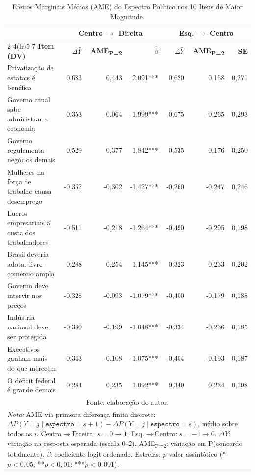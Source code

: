 \begin{table}[htbp]
\centering
\SingleSpacing
\caption{Efeitos Marginais Médios (AME) do Espectro Político nos 10 Itens de Maior Magnitude.}
\label{tab:ame_espectro_top10}
\footnotesize
\begin{tabular}{p{5.2cm}rrrrrr}
\toprule
 & \multicolumn{3}{c}{\textbf{Centro $\to$ Direita}} & \multicolumn{3}{c}{\textbf{Esq. $\to$ Centro}} \\
\cmidrule(lr){2-4}\cmidrule(lr){5-7}
\textbf{Item (DV)} & \textbf{$\Delta\bar{Y}$} & \textbf{AME\textsubscript{P=2}} & \textbf{$\hat{\beta}$} & \textbf{$\Delta\bar{Y}$} & \textbf{AME\textsubscript{P=2}} & \textbf{SE} \\
\midrule
Privatização de estatais é benéfica & 0,683 & 0,443 & 2,091*** & 0,620 & 0,158 & 0,271 \\
Governo atual sabe administrar a economia & -0,353 & -0,064 & -1,999*** & -0,675 & -0,265 & 0,293 \\
Governo regulamenta negócios demais & 0,529 & 0,377 & 1,842*** & 0,535 & 0,176 & 0,250 \\
Mulheres na força de trabalho causa desemprego & -0,352 & -0,302 & -1,427*** & -0,260 & -0,247 & 0,246 \\
Lucros empresariais à custa dos trabalhadores & -0,511 & -0,218 & -1,264*** & -0,490 & -0,295 & 0,198 \\
Brasil deveria adotar livre-comércio amplo & 0,288 & 0,254 & 1,145*** & 0,323 & 0,233 & 0,202 \\
Governo deve intervir nos preços & -0,328 & -0,093 & -1,079*** & -0,400 & -0,179 & 0,188 \\
Indústria nacional deve ser protegida & -0,380 & -0,199 & -1,048*** & -0,334 & -0,236 & 0,185 \\
Executivos ganham mais do que merecem & -0,343 & -0,108 & -1,075*** & -0,404 & -0,193 & 0,187 \\
O déficit federal é grande demais & 0,284 & 0,235 & 1,092*** & 0,349 & 0,234 & 0,198 \\
\bottomrule
\multicolumn{7}{c}{\footnotesize Fonte: elaboração do autor.} \\
\multicolumn{7}{p{14cm}}{\footnotesize \textit{Nota:} AME via primeira diferença finita discreta: $\Delta P(Y=j \mid \texttt{espectro}=s+1) - \Delta P(Y=j \mid \texttt{espectro}=s)$, médio sobre todos os $i$. Centro$\to$Direita: $s=0\to1$; Esq.$\to$Centro: $s=-1\to0$. $\Delta\bar{Y}$: variação na resposta esperada (escala 0--2). AME\textsubscript{P=2}: variação em P(concordo totalmente). $\hat{\beta}$: coeficiente logit ordenado. Estrelas: $p$-valor assintótico (*$p<0{,}05$; **$p<0{,}01$; ***$p<0{,}001$).} \\
\end{tabular}
\end{table}
